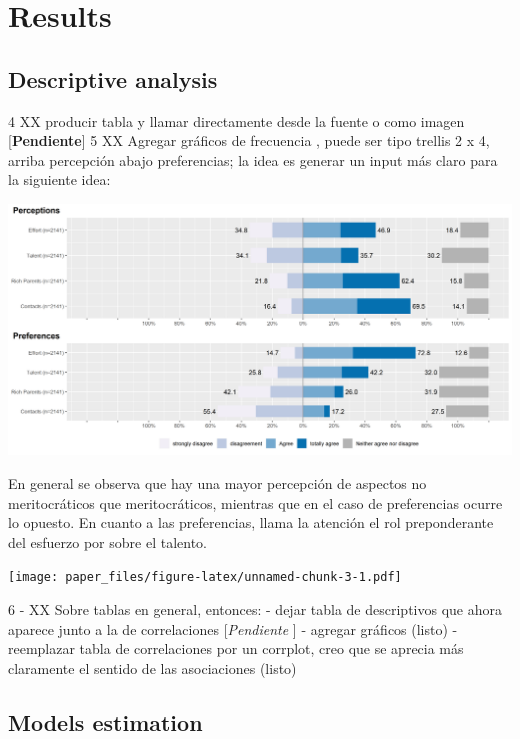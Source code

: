 \documentclass[
]{article}
\begin{document}
\hypertarget{results}{%
\section{Results}\label{results}}

\hypertarget{descriptive-analysis}{%
\subsection{Descriptive analysis}\label{descriptive-analysis}}

4 XX producir tabla y llamar directamente desde la fuente o como imagen
{[}\textbf{Pendiente}{]} 5 XX Agregar gráficos de frecuencia , puede ser
tipo trellis 2 x 4, arriba percepción abajo preferencias; la idea es
generar un input más claro para la siguiente idea:

\includegraphics{../output/images/plotlikert.png}

En general se observa que hay una mayor percepción de aspectos no
meritocráticos que meritocráticos, mientras que en el caso de
preferencias ocurre lo opuesto. En cuanto a las preferencias, llama la
atención el rol preponderante del esfuerzo por sobre el talento.

\texttt{[image: paper\_files/figure-latex/unnamed-chunk-3-1.pdf]}

6 - XX Sobre tablas en general, entonces: - dejar tabla de descriptivos
que ahora aparece junto a la de correlaciones {[}\emph{Pendiente} {]} -
agregar gráficos (listo) - reemplazar tabla de correlaciones por un
corrplot, creo que se aprecia más claramente el sentido de las
asociaciones (listo)

\hypertarget{models-estimation}{%
\subsection{Models estimation}\label{models-estimation}}
\end{document}

